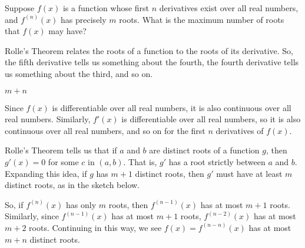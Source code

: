 \begin{question}\label{s2.14rollemultipleroots}
Suppose $f(x)$ is a function whose first $n$ derivatives exist over all real numbers, and $f^{(n)}(x)$ has precisely $m$ roots. What is the maximum number of roots that $f(x)$ may have?
\end{question}
\begin{hint}
Rolle's Theorem relates the roots of a function to the roots of its derivative. So, the fifth derivative tells us something about the fourth, the fourth derivative tells us something about the third, and so on.
\end{hint}
\begin{answer}
$m+n$
\end{answer}
\begin{solution}
Since $f(x)$ is differentiable over all real numbers, it is also continuous over all real numbers. Similarly, $f'(x)$ is differentiable over all real numbers, so it is also continuous over all real numbers, and so on for the first $n$ derivatives of $f(x)$.

Rolle's Theorem tells us that if $a$ and $b$ are distinct roots of a function $g$, then $g'(x)=0$ for some $c$ in $(a,b)$. That is, $g'$ has a root strictly between $a$ and $b$. Expanding this idea, if $g$ has $m+1$ distinct roots, then $g'$ must have at least $m$ distinct roots, as in the sketch below.

\begin{center}
\end{center}

So, if $f^{(n)}(x)$ has only $m$ roots, then $f^{(n-1)}(x)$ has at most $m+1$ roots. Similarly, since $f^{(n-1)}(x)$ has at most $m+1$ roots, $f^{(n-2)}(x)$ has at most $m+2$ roots. Continuing in this way, we see $f(x)=f^{(n-n)}(x)$ has at most $m+n$ distinct roots.
\end{solution}



